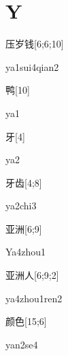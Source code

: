 ﻿%
\section*{Y}

\begin{verbete}{压岁钱}[6;6;10]
\begin{pronuncia}{ya1sui4qian2}
\end{pronuncia}
\end{verbete}

\begin{verbete}[ya1]{鸭}[10]
\begin{pronuncia}{ya1}
\end{pronuncia}
\end{verbete}

\begin{verbete}[ya2]{牙}[4]
\begin{pronuncia}{ya2}
\end{pronuncia}
\end{verbete}

\begin{verbete}[ya2chi3]{牙齿}[4;8]
\begin{pronuncia}{ya2chi3}
\end{pronuncia}
\end{verbete}

\begin{verbete}[Ya4zhou1]{亚洲}[6;9]
\begin{pronuncia}{Ya4zhou1}
\end{pronuncia}
\end{verbete}

\begin{verbete}{亚洲人}[6;9;2]
\begin{pronuncia}{ya4zhou1ren2}
\end{pronuncia}
\end{verbete}

\begin{verbete}[yan2se4]{颜色}[15;6]
\begin{pronuncia}{yan2se4}
\end{pronuncia}
\end{verbete}


